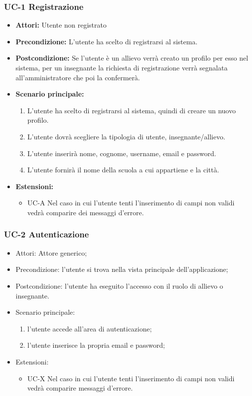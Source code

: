 \subsubsection{UC-1 Registrazione}
\begin{itemize}
		\item \textbf{Attori: }Utente non registrato
		\item \textbf{Precondizione: }L'utente ha scelto di registrarsi al sistema.
		\item \textbf{Postcondizione: }Se l'utente è un allievo verrà creato un profilo per esso nel sistema, per un insegnante la richiesta di registrazione verrà segnalata all'amministratore che poi la confermerà.
		\item \textbf{Scenario principale: }
		\begin{enumerate}
		\item L'utente ha scelto di registrarsi al sistema, quindi di creare un nuovo profilo. 
		\item L'utente dovrà scegliere la tipologia di utente, insegnante/allievo. 
		\item L'utente inserirà nome, cognome, username, email e password.
		\item L'utente fornirà il nome della scuola a cui appartiene e la città. 
		\end{enumerate}
		\item \textbf{Estensioni: }
		\begin{itemize}
			\item UC-A Nel caso in cui l'utente tenti l'inserimento di campi non validi vedrà comparire dei messaggi d'errore.
		\end{itemize}
	\end{itemize}
\subsubsection{UC-2 Autenticazione}
		\begin{itemize}
			\item Attori: Attore generico;
			\item Precondizione: l'utente si trova nella vista principale dell'applicazione;
			\item Postcondizione: l'utente ha eseguito l'accesso con il ruolo di allievo o insegnante.
			\item Scenario principale:
				\begin{enumerate}
					\item l'utente accede all'area di autenticazione;
					\item l'utente inserisce la propria email e password;
				\end{enumerate}
				\item Estensioni:
				\begin{itemize}
					\item UC-X Nel caso in cui l'utente tenti l'inserimento di campi non validi vedrà comparire messaggi d'errore.
				\end{itemize}
		\end{itemize}
		
